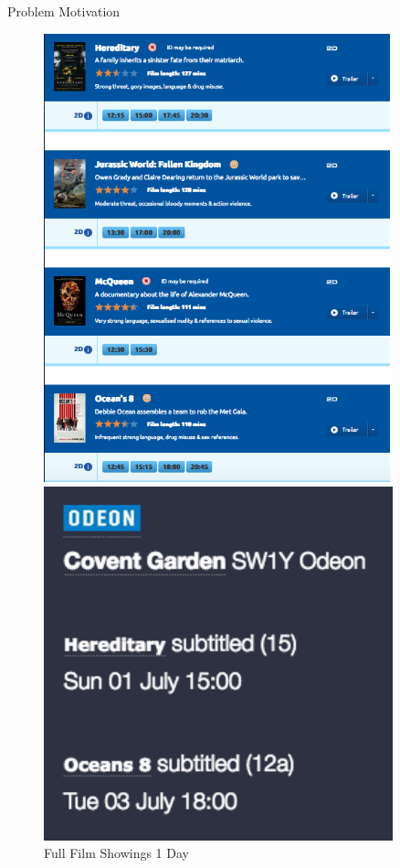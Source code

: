 \documentclass[notes]{beamer}
\begin{document}

\begin{frame}{Problem Motivation}
\begin{figure}
	\centering
	\begin{minipage}{0.45\textwidth}
		\centering
		\includegraphics[width=0.9\textwidth]{figures/ALLMOVIESLONDONFULL} %
		\caption{Full Film Showings 1 Day}
	\end{minipage}\hfill
	\begin{minipage}{0.45\textwidth}
		\centering
		\includegraphics[width=0.9\textwidth]{figures/SUBSMOVIESLONDON} %

\end{minipage}
\end{figure}
\end{frame}
\end{document}
